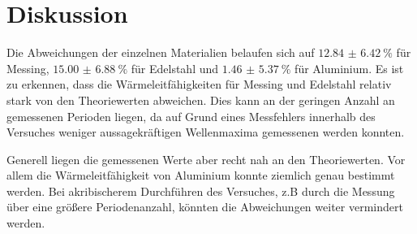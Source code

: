 \section{Diskussion}
\label{sec:Diskussion}

Die Abweichungen der einzelnen Materialien belaufen sich auf $\SI{12.84(642)}{\percent}$ für Messing, $\SI{15.00(688)}{\percent}$ für Edelstahl und $\SI{1.46(537)}{\percent}$ für Aluminium. Es ist zu erkennen, dass die Wärmeleitfähigkeiten für Messing und Edelstahl relativ stark von den Theoriewerten abweichen. Dies kann an der geringen Anzahl an gemessenen Perioden liegen, da auf Grund eines Messfehlers innerhalb des Versuches weniger aussagekräftigen Wellenmaxima gemessenen werden konnten. 

Generell liegen die gemessenen Werte aber recht nah an den Theoriewerten. Vor allem die Wärmeleitfähigkeit von Aluminium konnte ziemlich genau bestimmt werden. Bei akribischerem Durchführen des Versuches, z.B durch die Messung über eine größere Periodenanzahl, könnten die Abweichungen weiter vermindert werden. 


